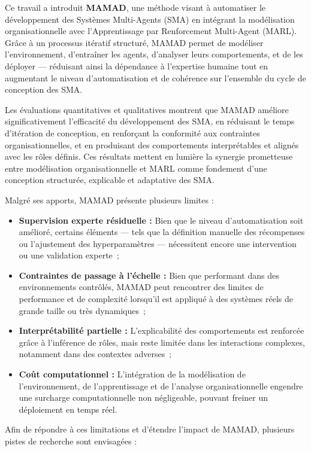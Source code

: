 Ce travail a introduit \textbf{MAMAD}, une méthode visant à automatiser le développement des Systèmes Multi-Agents (SMA) en intégrant la modélisation organisationnelle avec l'Apprentissage par Renforcement Multi-Agent (MARL). Grâce à un processus itératif structuré, MAMAD permet de modéliser l'environnement, d'entraîner les agents, d'analyser leurs comportements, et de les déployer — réduisant ainsi la dépendance à l'expertise humaine tout en augmentant le niveau d'automatisation et de cohérence sur l'ensemble du cycle de conception des SMA.

Les évaluations quantitatives et qualitatives montrent que MAMAD améliore significativement l'efficacité du développement des SMA, en réduisant le temps d'itération de conception, en renforçant la conformité aux contraintes organisationnelles, et en produisant des comportements interprétables et alignés avec les rôles définis. Ces résultats mettent en lumière la synergie prometteuse entre modélisation organisationnelle et MARL comme fondement d'une conception structurée, explicable et adaptative des SMA.

Malgré ses apports, MAMAD présente plusieurs limites :

\begin{itemize}
    \item \textbf{Supervision experte résiduelle :} Bien que le niveau d'automatisation soit amélioré, certains éléments — tels que la définition manuelle des récompenses ou l'ajustement des hyperparamètres — nécessitent encore une intervention ou une validation experte~;
    \item \textbf{Contraintes de passage à l'échelle :} Bien que performant dans des environnements contrôlés, MAMAD peut rencontrer des limites de performance et de complexité lorsqu'il est appliqué à des systèmes réels de grande taille ou très dynamiques~;
    \item \textbf{Interprétabilité partielle :} L'explicabilité des comportements est renforcée grâce à l'inférence de rôles, mais reste limitée dans les interactions complexes, notamment dans des contextes adverses~;
    \item \textbf{Coût computationnel :} L'intégration de la modélisation de l'environnement, de l'apprentissage et de l'analyse organisationnelle engendre une surcharge computationnelle non négligeable, pouvant freiner un déploiement en temps réel.
\end{itemize}

\noindent Afin de répondre à ces limitations et d'étendre l'impact de MAMAD, plusieurs pistes de recherche sont envisagées :

